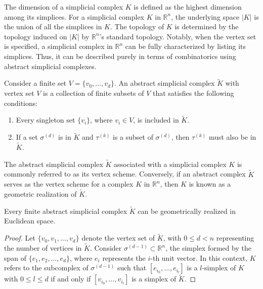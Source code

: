 The dimension of a simplicial complex $K$ is defined as the highest dimension among
its simplices. For a simplicial complex $K$ in $\mathbb{R}^{n}$, the underlying space
$\vert K \vert$ is the union of all the simplices in $K$. The topology of $K$ is
determined by the topology induced on $\vert K \vert$ by $\mathbb{R}^{n}$'s
standard topology. Notably, when the vertex set is specified, a simplicial complex
in $\mathbb{R}^{n}$ can be fully characterized by listing its simplices. Thus, it
can be described purely in terms of combinatorics using abstract simplicial complexes.

\begin{definition}
	{\cite[\S 2.3]{boissonnat2018geometric}} \label{abstractsimplicialcomplex}
	Consider a finite set $V = \{v_{0}, \ldots, v_{d}\}$. An abstract simplicial
	complex $\tilde{K}$ with vertex set $V$ is a
	collection of finite subsets of $V$ that satisfies the following conditions:
	\begin{enumerate}
		\item Every singleton set $\{v_{i}\}$, where $v_{i} \in V$, is included in $\tilde
			{K}$.

		\item If a set $\sigma^{(d)}$ is in $\tilde{K}$ and $\tau^{(k)}$ is a subset
			of $\sigma^{(d)}$, then $\tau^{(k)}$ must also be in $\tilde{K}$.
	\end{enumerate}
\end{definition}

The abstract simplicial complex $\tilde{K}$ associated with a simplicial complex
$K$ is commonly referred to as its vertex scheme.
Conversely, if an abstract complex $\tilde{K}$ serves as the vertex scheme for a
complex $K$ in $\mathbb{R}^{n}$, then $K$ is known as a geometric realization of $\tilde{K}$.

\begin{proposition}
	Every finite abstract simplicial complex $\tilde{K}$ can be geometrically realized
	in Euclidean space.
\end{proposition}

\begin{proof}
	Let $\{v_{0}, v_{1}, \ldots, v_{d}\}$ denote the vertex set of $\tilde{K}$,
	with $0 \leq d < n$ representing the number of vertices in $\tilde{K}$. Consider $\sigma^{(d-1)}
	\subset \mathbb{R}^{n}$, the simplex formed by the span of
	$\{e_{1}, e_{2}, \ldots, e_{d}\}$, where $e_{i}$ represents the $i$-th unit vector.
	In this context, $K$ refers to the subcomplex of $\sigma^{(d-1)}$ such that $[e
	_{i_0}, \ldots, e_{i_l}]$ is a $l$-simplex of $K$ with $0 \leq l \leq d$ if and only if $[v_{i_0}, \ldots
	, v_{i_l}]$ is a simplex of $\tilde{K}$.
\end{proof}

